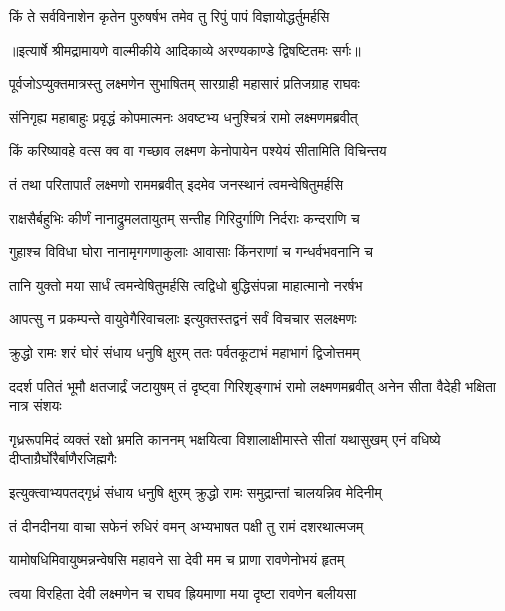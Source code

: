 \twolineshloka
{किं ते सर्वविनाशेन कृतेन पुरुषर्षभ}
{तमेव तु रिपुं पापं विज्ञायोद्धर्तुमर्हसि} %


{॥इत्यार्षे श्रीमद्रामायणे वाल्मीकीये आदिकाव्ये अरण्यकाण्डे द्विषष्टितमः सर्गः॥}


\twolineshloka
{पूर्वजोऽप्युक्तमात्रस्तु लक्ष्मणेन सुभाषितम्}
{सारग्राही महासारं प्रतिजग्राह राघवः} %

\twolineshloka
{संनिगृह्य महाबाहुः प्रवृद्धं कोपमात्मनः}
{अवष्टभ्य धनुश्चित्रं रामो लक्ष्मणमब्रवीत्} %

\twolineshloka
{किं करिष्यावहे वत्स क्व वा गच्छाव लक्ष्मण}
{केनोपायेन पश्येयं सीतामिति विचिन्तय} %

\twolineshloka
{तं तथा परितापार्तं लक्ष्मणो राममब्रवीत्}
{इदमेव जनस्थानं त्वमन्वेषितुमर्हसि} %

\twolineshloka
{राक्षसैर्बहुभिः कीर्णं नानाद्रुमलतायुतम्}
{सन्तीह गिरिदुर्गाणि निर्दराः कन्दराणि च} %

\twolineshloka
{गुहाश्च विविधा घोरा नानामृगगणाकुलाः}
{आवासाः किंनराणां च गन्धर्वभवनानि च} %

\twolineshloka
{तानि युक्तो मया सार्धं त्वमन्वेषितुमर्हसि}
{त्वद्विधो बुद्धिसंपन्ना माहात्मानो नरर्षभ} %

\twolineshloka
{आपत्सु न प्रकम्पन्ते वायुवेगैरिवाचलाः}
{इत्युक्तस्तद्वनं सर्वं विचचार सलक्ष्मणः} %

\twolineshloka
{क्रुद्धो रामः शरं घोरं संधाय धनुषि क्षुरम्}
{ततः पर्वतकूटाभं महाभागं द्विजोत्तमम्} %

\threelineshloka
{ददर्श पतितं भूमौ क्षतजार्द्रं जटायुषम्}
{तं दृष्ट्वा गिरिशृङ्गाभं रामो लक्ष्मणमब्रवीत्}
{अनेन सीता वैदेही भक्षिता नात्र संशयः} %

\threelineshloka
{गृध्ररूपमिदं व्यक्तं रक्षो भ्रमति काननम्}
{भक्षयित्वा विशालाक्षीमास्ते सीतां यथासुखम्}
{एनं वधिष्ये दीप्ताग्रैर्घोरैर्बाणैरजिह्मगैः} %

\twolineshloka
{इत्युक्त्वाभ्यपतद्गृध्रं संधाय धनुषि क्षुरम्}
{क्रुद्धो रामः समुद्रान्तां चालयन्निव मेदिनीम्} %

\twolineshloka
{तं दीनदीनया वाचा सफेनं रुधिरं वमन्}
{अभ्यभाषत पक्षी तु रामं दशरथात्मजम्} %

\twolineshloka
{यामोषधिमिवायुष्मन्नन्वेषसि महावने}
{सा देवी मम च प्राणा रावणेनोभयं हृतम्} %

\twolineshloka
{त्वया विरहिता देवी लक्ष्मणेन च राघव}
{ह्रियमाणा मया दृष्टा रावणेन बलीयसा} %

